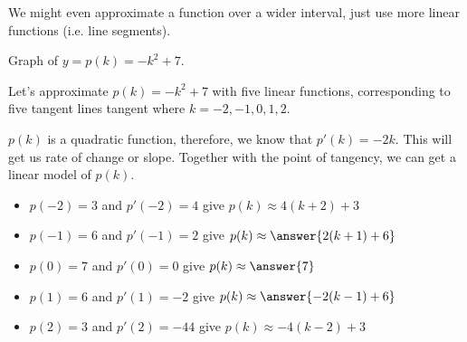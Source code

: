 \documentclass{ximera}
\begin{document}
We might even approximate a function over a wider interval, just use more linear functions (i.e. line segments).





Graph of $y = p(k) = -k^2 + 7$.




\begin{image}
\end{image}




Let's approximate $p(k) = -k^2+7$ with five linear functions, corresponding to five tangent lines tangent where $k=-2, -1, 0, 1, 2$.

$p(k)$ is a quadratic function, therefore, we know that $p'(k) = -2k$.  This will get us rate of change or slope.  Together with the point of tangency, we can get a linear model of $p(k)$.


\begin{model}

\begin{itemize}
\item $p(-2) = 3$ and $p'(-2) = 4$ give $p(k) \approx 4(k+2)+3$
\item $p(-1) = 6$ and $p'(-1) = 2$ give $p(k) \approx \answer{2(k+1)+6}$
\item $p(0) = 7$ and $p'(0) = 0$   give $p(k) \approx \answer{7}$
\item $p(1) = 6$ and $p'(1) = -2$   give  $ p(k) \approx \answer{-2(k-1)+6}$
\item $p(2) = 3$ and $p'(2) = -44$   give $p(k) \approx -4(k-2)+3$
\end{itemize}

\end{model}
\end{document}
